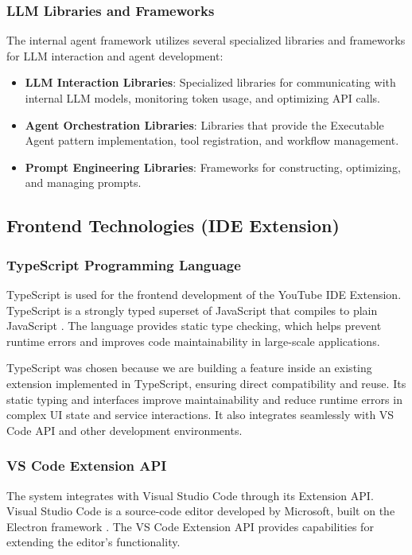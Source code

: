 \begin{spacing}{1.2}
\subsubsection{LLM Libraries and Frameworks}
The internal agent framework utilizes several specialized libraries and frameworks for LLM interaction and agent development:

\begin{itemize}
    \item \textbf{LLM Interaction Libraries}: Specialized libraries for communicating with internal LLM models, monitoring token usage, and optimizing API calls.
    \item \textbf{Agent Orchestration Libraries}: Libraries that provide the Executable Agent pattern implementation, tool registration, and workflow management.
    \item \textbf{Prompt Engineering Libraries}: Frameworks for constructing, optimizing, and managing prompts.
\end{itemize}

\subsection{Frontend Technologies (IDE Extension)}

\subsubsection{TypeScript Programming Language}
TypeScript is used for the frontend development of the YouTube IDE Extension. TypeScript is a strongly typed superset of JavaScript that compiles to plain JavaScript \cite{bierman2014understanding}. The language provides static type checking, which helps prevent runtime errors and improves code maintainability in large-scale applications.

TypeScript was chosen because we are building a feature inside an existing extension implemented in TypeScript, ensuring direct compatibility and reuse. Its static typing and interfaces improve maintainability and reduce runtime errors in complex UI state and service interactions. It also integrates seamlessly with VS Code API and other development environments.


\subsubsection{VS Code Extension API}
The system integrates with Visual Studio Code through its Extension API. Visual Studio Code is a source-code editor developed by Microsoft, built on the Electron framework \cite{castor2016visual}. The VS Code Extension API provides capabilities for extending the editor's functionality.


\end{spacing}
